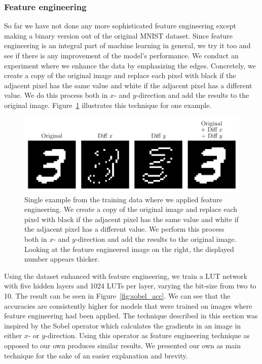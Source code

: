 \subsubsection{Feature engineering} \label{sec:feature_engineering}
So far we have not done any more sophisticated feature engineering except making a binary version out of the original MNIST dataset. Since feature engineering is an integral part of machine learning in general, we try it too and see if there is any improvement of the model's performance. We conduct an experiment where we enhance the data by emphasizing the edges. Concretely, we create a copy of the original image and replace each pixel with black if the adjacent pixel has the same value and white if the adjacent pixel has a different value. We do this process both in $x$- and $y$-direction and add the results to the original image. Figure~\ref{fig:sobel_single} illustrates this technique for one example.

\begin{figure}[!htb]
    \centering
    \includegraphics[width=.9\linewidth]{images/diff.pdf}
    \caption{Single example from the training data where we applied feature engineering. We create a copy of the original image and replace each pixel with black if the adjacent pixel has the same value and white if the adjacent pixel has a different value. We perform this process both in $x$- and $y$-direction and add the results to the original image. Looking at the feature engineered image on the right, the displayed number appears thicker.}
\label{fig:sobel_single}
\end{figure}
\FloatBarrier

\noindent Using the dataset enhanced with feature engineering, we train a LUT network with five hidden layers and 1024 LUTs per layer, varying the bit-size from two to 10. The result can be seen in Figure~\ref{fig:sobel_acc}. We can see that the accuracies are consistently higher for models that were trained on images where feature engineering had been applied. The technique described in this section was inspired by the Sobel operator \cite{sobelsobel} which calculates the gradients in an image in either $x$- or $y$-direction. Using this operator as feature engineering technique as opposed to our own produces similar results. We presented our own as main technique for the sake of an easier explanation and brevity.

